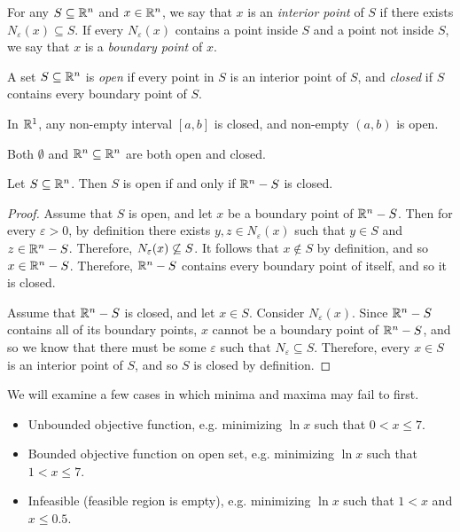\begin{defn}
    For any $S \subseteq \mathbb{R}^n$ and $x \in \mathbb{R}^n$, we say that $x$ is an \emph{interior point} of $S$ if there exists $N_{\varepsilon}(x) \subseteq S$. If every $N_{\varepsilon}(x)$ contains a point inside $S$ and a point not inside $S$, we say that $x$ is a \emph{boundary point} of $x$.
\end{defn}

\begin{defn}
    A set $S \subseteq \mathbb{R}^n$ is \emph{open} if every point in $S$ is an interior point of $S$, and \emph{closed} if $S$ contains every boundary point of $S$.
\end{defn}

\begin{exmp}
    In $\mathbb{R}^1$, any non-empty interval $[a, b]$ is closed, and non-empty $(a, b)$ is open.
\end{exmp}

\begin{exmp}
    Both $\emptyset$ and $\mathbb{R}^n \subseteq \mathbb{R}^n$ are both open and closed.
\end{exmp}

\begin{prop}
    Let $S \subseteq \mathbb{R}^n$. Then $S$ is open if and only if $\mathbb{R}^n - S$ is closed.
\end{prop}

\begin{proof}
    Assume that $S$ is open, and let $x$ be a boundary point of $\mathbb{R}^n - S$. Then for every $\varepsilon > 0$, by definition there exists $y, z \in N_{\varepsilon}(x)$ such that $y \in S$ and $z \in \mathbb{R}^n - S$. Therefore, $N_{\varepsilon}(x) \centernot\subseteq S$. It follows that $x \notin S$ by definition, and so $x \in \mathbb{R}^n - S$. Therefore, $\mathbb{R}^n - S$ contains every boundary point of itself, and so it is closed.

    Assume that $\mathbb{R}^n - S$ is closed, and let $x \in S$. Consider $N_{\varepsilon}(x)$. Since $\mathbb{R}^n - S$ contains all of its boundary points, $x$ cannot be a boundary point of $\mathbb{R}^n - S$, and so we know that there must be some $\varepsilon$ such that $N_{\varepsilon} \subseteq S$. Therefore, every $x \in S$ is an interior point of $S$, and so $S$ is closed by definition.
\end{proof}

\begin{exmp}
    We will examine a few cases in which minima and maxima may fail to first.

    \begin{itemize}
        \item Unbounded objective function, e.g. minimizing $\ln x$ such that $0 < x \leq 7$.
        \item Bounded objective function on open set, e.g. minimizing $\ln x$ such that $1 < x \leq 7$.
        \item Infeasible (feasible region is empty), e.g. minimizing $\ln x$ such that $1 < x$ and $x \leq 0.5$.
    \end{itemize}
\end{exmp}


